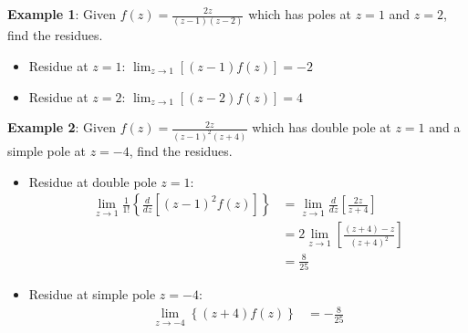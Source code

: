 \documentclass[10pt,a4paper]{article}
\begin{document}
\textbf{Example 1}: Given $f(z)=\frac{2z}{(z-1)(z-2)}$ which has poles at $z=1$ and $z=2$, find the
residues.
\begin{itemize}
    \item Residue at $z=1$: $\lim_{z\rightarrow 1}\left[(z-1)f(z)\right] = -2$
    \item Residue at $z=2$: $\lim_{z\rightarrow 1}\left[(z-2)f(z)\right] = 4$
\end{itemize}

\textbf{Example 2}: Given $f(z)=\frac{2z}{(z-1)^2(z+4)}$ which has double pole at $z=1$ and a simple
pole at $z=-4$, find the residues.
\begin{itemize}
    \item Residue at double pole $z=1$: 
    \begin{equation*} 
        \begin{aligned}
            \lim_{z \rightarrow 1} \frac{1}{1!} \left\{\frac{d}{dz} [(z-1)^2f(z)] \right\} &= \lim_{z \rightarrow 1} \frac{d}{dz} \left[\frac{2z}{z+4}\right] \\
            &= 2\lim_{z \rightarrow 1} \left[\frac{(z+4)-z}{(z+4)^2}\right] \\
            &= \frac{8}{25}
        \end{aligned}
    \end{equation*}
    \item Residue at simple pole $z=-4$:
    \begin{equation*} 
        \begin{aligned}
            \lim_{z \rightarrow -4} \left\{(z+4)f(z)\right\} &= -\frac{8}{25}
        \end{aligned}
    \end{equation*}
\end{itemize}
\end{document}

